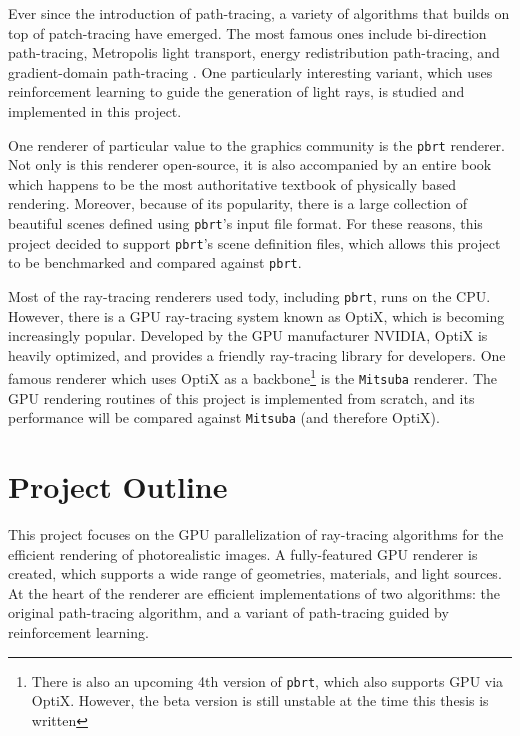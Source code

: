 Ever since the introduction of path-tracing, a variety of algorithms that builds on top of patch-tracing have emerged. The most famous ones include bi-direction path-tracing\cite{veach1997robust}, Metropolis light transport\cite{veach1997robust}\cite{kelemen2002simple}, energy redistribution path-tracing\cite{cline2005energy}, and gradient-domain path-tracing \cite{kettunen2015gradient}. One particularly interesting variant, which uses reinforcement learning to guide the generation of light rays\cite{RLPT}, is studied and implemented in this project. 

One renderer of particular value to the graphics community is the \texttt{pbrt} renderer. Not only is this renderer open-source, it is also accompanied by an entire book\cite{pharr2016physically} which happens to be the most authoritative textbook of physically based rendering. Moreover, because of its popularity, there is a large collection of beautiful scenes defined using \texttt{pbrt}'s input file format. For these reasons, this project decided to support \texttt{pbrt}'s scene definition files, which allows this project to be benchmarked and compared against \texttt{pbrt}.

Most of the ray-tracing renderers used tody, including \texttt{pbrt}, runs on the CPU. However, there is a GPU ray-tracing system known as OptiX\cite{parker2010optix}, which is becoming increasingly popular. Developed by the GPU manufacturer NVIDIA, OptiX is heavily optimized, and provides a friendly ray-tracing library for developers. One famous renderer which uses OptiX as a backbone\footnote{There is also an upcoming 4th version of \texttt{pbrt}, which also supports GPU via OptiX. However, the beta version is still unstable at the time this thesis is written} is the \texttt{Mitsuba} renderer. The GPU rendering routines of this project is implemented from scratch, and its performance will be compared against \texttt{Mitsuba} (and therefore OptiX).

\section{Project Outline}
This project focuses on the GPU parallelization of ray-tracing algorithms for the efficient rendering of photorealistic images. A fully-featured GPU renderer is created, which supports a wide range of geometries, materials, and light sources. At the heart of the renderer are efficient implementations of two algorithms: the original path-tracing algorithm, and a variant of path-tracing guided by reinforcement learning. 

